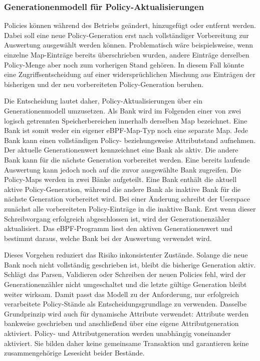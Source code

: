 \subsubsection{Generationenmodell für Policy-Aktualisierungen}\label{sec:entscheidung-policy-generationen}
Policies können während des Betriebs geändert, hinzugefügt oder entfernt werden.
Dabei soll eine neue Policy-Generation erst nach vollständiger Vorbereitung zur Auswertung ausgewählt werden können.
Problematisch wäre beispielsweise, wenn einzelne Map-Einträge bereits überschrieben wurden, andere Einträge derselben Policy-Menge aber noch zum vorherigen Stand gehören.
In diesem Fall könnte eine Zugriffsentscheidung auf einer widersprüchlichen Mischung aus Einträgen der bisherigen und der neu vorbereiteten Policy-Generation beruhen.

Die Entscheidung lautet daher, Policy-Aktualisierungen über ein Generationenmodell umzusetzen.
Als Bank wird im Folgenden einer von zwei logisch getrennten Speicherbereichen innerhalb derselben
Map bezeichnet. Eine Bank ist somit weder ein eigener eBPF-Map-Typ noch eine separate Map. Jede
Bank kann einen vollständigen Policy- beziehungsweise Attributstand aufnehmen.
Der aktuelle Generationenwert kennzeichnet eine Bank als aktiv.
Die andere Bank kann für die nächste Generation vorbereitet werden.
Eine bereits laufende Auswertung kann jedoch noch auf die zuvor ausgewählte Bank zugreifen.
Die Policy-Maps werden in zwei Bänke aufgeteilt.
Eine Bank enthält die aktuell aktive Policy-Generation, während die andere Bank als inaktive Bank für die nächste Generation vorbereitet wird.
Bei einer Änderung schreibt der Userspace zunächst alle vorbereiteten Policy-Einträge in die inaktive Bank.
Erst wenn dieser Schreibvorgang erfolgreich abgeschlossen ist, wird der Generationenzähler aktualisiert.
Das eBPF-Programm liest den aktiven Generationenwert und bestimmt daraus, welche Bank bei der Auswertung verwendet wird.

Dieses Vorgehen reduziert das Risiko inkonsistenter Zustände.
Solange die neue Bank noch nicht vollständig geschrieben ist, bleibt die bisherige Generation aktiv.
Schlägt das Parsen, Validieren oder Schreiben der neuen Policies fehl, wird der Generationenzähler nicht umgeschaltet und die letzte gültige Generation bleibt weiter wirksam.
Damit passt das Modell zu der Anforderung, nur erfolgreich verarbeitete Policy-Stände als Entscheidungsgrundlage zu verwenden.
Dasselbe Grundprinzip wird auch für dynamische Attribute verwendet: Attribute werden bankweise geschrieben und anschließend über eine eigene Attributgeneration aktiviert.
Policy- und Attributgeneration werden unabhängig voneinander aktiviert. Sie bilden daher keine gemeinsame Transaktion und garantieren keine zusammengehörige Lesesicht beider Bestände.

